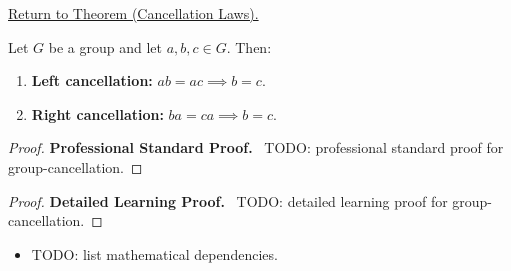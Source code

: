 \newpage
{}
\label{prf:group-cancellation}

\begin{remark*}[Return]
\hyperref[prop:group-cancellation]{Return to Theorem (Cancellation Laws).}
\end{remark*}

\begin{theorem*}
Let $G$ be a group and let $a, b, c \in G$. Then:
\begin{enumerate}[label=(\roman*)]
  \item \textbf{Left cancellation:} $ab = ac \implies b = c$.
  \item \textbf{Right cancellation:} $ba = ca \implies b = c$.
\end{enumerate}
\end{theorem*}

\begin{proof}
\textbf{Professional Standard Proof.}~
TODO: professional standard proof for group-cancellation.
\end{proof}

\begin{proof}
\textbf{Detailed Learning Proof.}~
TODO: detailed learning proof for group-cancellation.
\end{proof}

\begin{remark*}
\end{remark*}

\begin{dependencies}
\begin{itemize}
  \item TODO: list mathematical dependencies.
\end{itemize}
\end{dependencies}

\clearpage
